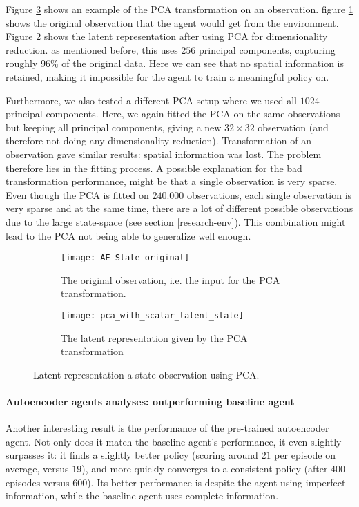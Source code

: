 Figure \ref{fig:pca-state} shows an example of the PCA transformation on an observation. figure \ref{fig:pca-original} shows the original observation that the agent would get from the environment. Figure \ref{fig:pca-latent} shows the latent representation after using PCA for dimensionality reduction. as mentioned before, this uses $256$ principal components, capturing roughly $96\%$ of the original data. Here we can see that no spatial information is retained, making it impossible for the agent to train a meaningful policy on. 

Furthermore, we also tested a different PCA setup where we used all $1024$ principal components. Here, we again fitted the PCA on the same observations but keeping all principal components, giving a new $32 \times 32$ observation (and therefore not doing any dimensionality reduction). Transformation of an observation gave similar results: spatial information was lost. The problem therefore lies in the fitting process. A possible explanation for the bad transformation performance, might be that a single observation is very sparse. Even though the PCA is fitted on $240.000$ observations, each single observation is very sparse and at the same time, there are a lot of different possible observations due to the large state-space (see section \ref{research-env}). This combination might lead to the PCA not being able to generalize well enough.

\begin{figure}[h!]
	\centering
	\begin{subfigure}[b]{0.75\textwidth}
		\texttt{[image: AE\_State\_original]}
		\caption{The original observation, i.e. the input for the PCA transformation.}
		\label{fig:pca-original} 
	\end{subfigure}
	\begin{subfigure}[b]{0.75\textwidth}
		\texttt{[image: pca\_with\_scalar\_latent\_state]}
		\caption{The latent representation given by the PCA transformation}
		\label{fig:pca-latent}
	\end{subfigure}
	\caption{Latent representation a state observation using PCA.}
	\label{fig:pca-state}
\end{figure}

\paragraph{Autoencoder agents analyses: outperforming baseline agent}
Another interesting result is the performance of the pre-trained autoencoder agent. Not only does it match the baseline agent's performance, it even slightly surpasses it: it finds a slightly better policy (scoring around $21$ per episode on average, versus $19$), and more quickly converges to a consistent policy (after $400$ episodes versus $600$). Its better performance is despite the agent using imperfect information, while the baseline agent uses complete information.

